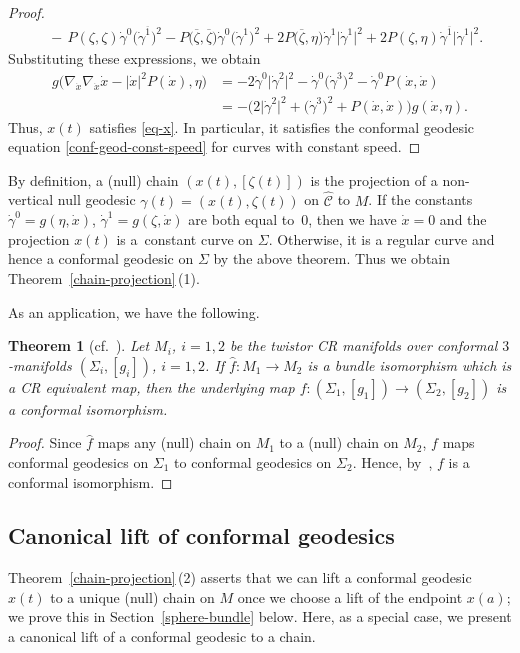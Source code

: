 \documentclass[pdftex]{sigma}
\newcommand\ol{\overline}
\newcommand{\wh}{\widehat}
\numberwithin{equation}{section}
\newtheorem{Theorem}{Theorem}[section]
\begin{document}
\begin{proof}
\begin{align*}
&{}{-}\, P(\zeta, \zeta) \dot\gamma^0\bigl(\dot\gamma^{\ol1}\bigr)^2\!-P\bigl(\ol\zeta, \ol\zeta\bigr) \dot\gamma^0\bigl(\dot\gamma^{1}\bigr)^2+2P\bigl(\ol\zeta, \eta\bigr)\dot\gamma^1\bigl|\dot\gamma^1\bigr|^2
 + 2P(\zeta, \eta)\dot\gamma^{\ol1}\bigl|\dot\gamma^1\bigr|^2.
\end{align*}
Substituting these expressions, we obtain
\begin{align*}
g\bigl(\nabla_{\dot x}\nabla_{\dot x}\dot x-|\dot x|^2P(\dot x) ,\eta\bigr)
&=-2\dot\gamma^0\bigl|\dot\gamma^2\bigr|^2-\dot\gamma^0\bigl(\dot\gamma^3\bigr)^2-\dot\gamma^0P(\dot x, \dot x) \\
&=-\bigl(2\bigl|\dot\gamma^2\bigr|^2+\bigl(\dot\gamma^3\bigr)^2+P(\dot x, \dot x)\bigr)g(\dot x, \eta).
\end{align*}
Thus, $x(t)$ satisfies \eqref{eq-x}. In particular, it satisfies the conformal geodesic equation \eqref{conf-geod-const-speed} for curves with constant speed.
\end{proof}

By definition, a (null) chain $(x(t), [\zeta(t)])$ is the projection of a non-vertical null geodesic $\gamma(t)=(x(t), \zeta(t))$ on $\wh{\mathcal{C}}$ to $M$. If the constants $\dot\gamma^0=g(\eta, \dot x)$,
$\dot\gamma^1=g(\zeta, \dot x)$ are both equal to~0, then we have $\dot x=0$ and the projection $x(t)$ is a~constant curve on $\Sigma$. Otherwise, it is a regular curve and hence a conformal geodesic on $\Sigma$ by the above theorem. Thus we obtain Theorem~\ref{chain-projection}\,(1).

As an application, we have the following.

\begin{Theorem}[cf.\ \cite{SY}]
Let $M_i$, $i=1, 2$ be the twistor CR manifolds over conformal $3$-manifolds $(\Sigma_i, [g_i])$, $i=1, 2$. If $\wh f\colon M_1\to M_2$ is a bundle isomorphism which is a CR equivalent map, then the underlying map $f\colon (\Sigma_1, [g_1])\to (\Sigma_2, [g_2])$ is a conformal isomorphism.
\end{Theorem}
\begin{proof}
Since $\wh f$ maps any (null) chain on $M_1$ to a (null) chain on $M_2$, $f$ maps conformal geodesics on $\Sigma_1$ to conformal geodesics on $\Sigma_2$. Hence, by~\cite[Theorem 2.3]{Kuo}, $f$ is a conformal isomorphism.
\end{proof}

\subsection{Canonical lift of conformal geodesics}\label{lift}
Theorem~\ref{chain-projection}\,(2) asserts that we can lift a conformal geodesic $x(t)$ to a unique (null) chain on $M$ once we choose a lift of the endpoint $x(a)$; we prove this in Section~\ref{sphere-bundle} below.
Here, as a special case, we present a canonical lift of a conformal geodesic to a chain.
\end{document}
